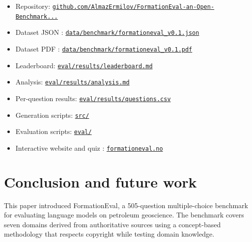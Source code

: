 \documentclass[11pt]{article}
\begin{document}
\begin{itemize}
  \item Repository: \href{https://github.com/AlmazErmilov/FormationEval-an-Open-Benchmark-for-Oil-Gas-Geoscience-MCQ-Evaluation}{\texttt{github.com/AlmazErmilov/FormationEval-an-Open-Benchmark...}}
  \item Dataset JSON \cite{formationeval_dataset}: \href{https://github.com/AlmazErmilov/FormationEval-an-Open-Benchmark-for-Oil-Gas-Geoscience-MCQ-Evaluation/blob/v0.1/data/benchmark/formationeval_v0.1.json}{\texttt{data/benchmark/formationeval\_v0.1.json}}
  \item Dataset PDF \cite{formationeval_pdf}: \href{https://github.com/AlmazErmilov/FormationEval-an-Open-Benchmark-for-Oil-Gas-Geoscience-MCQ-Evaluation/blob/v0.1/data/benchmark/formationeval_v0.1.pdf}{\texttt{data/benchmark/formationeval\_v0.1.pdf}}
  \item Leaderboard: \href{https://github.com/AlmazErmilov/FormationEval-an-Open-Benchmark-for-Oil-Gas-Geoscience-MCQ-Evaluation/blob/v0.1/eval/results/leaderboard.md}{\texttt{eval/results/leaderboard.md}}
  \item Analysis: \href{https://github.com/AlmazErmilov/FormationEval-an-Open-Benchmark-for-Oil-Gas-Geoscience-MCQ-Evaluation/blob/v0.1/eval/results/analysis.md}{\texttt{eval/results/analysis.md}}
  \item Per-question results: \href{https://github.com/AlmazErmilov/FormationEval-an-Open-Benchmark-for-Oil-Gas-Geoscience-MCQ-Evaluation/blob/v0.1/eval/results/questions.csv}{\texttt{eval/results/questions.csv}}
  \item Generation scripts: \href{https://github.com/AlmazErmilov/FormationEval-an-Open-Benchmark-for-Oil-Gas-Geoscience-MCQ-Evaluation/tree/v0.1/src}{\texttt{src/}}
  \item Evaluation scripts: \href{https://github.com/AlmazErmilov/FormationEval-an-Open-Benchmark-for-Oil-Gas-Geoscience-MCQ-Evaluation/tree/v0.1/eval}{\texttt{eval/}}
  \item Interactive website and quiz \cite{formationeval_website}: \href{https://www.formationeval.no}{\texttt{formationeval.no}}
\end{itemize}

\section{Conclusion and future work}

This paper introduced FormationEval, a 505-question multiple-choice benchmark for evaluating language models on petroleum geoscience. The benchmark covers seven domains derived from authoritative sources using a concept-based methodology that respects copyright while testing domain knowledge.
\end{document}
